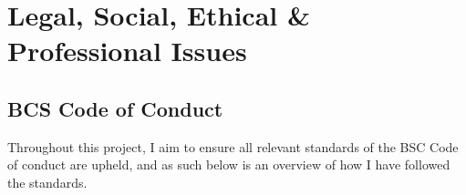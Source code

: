 \chapter{Legal, Social, Ethical \& Professional Issues}


\section{BCS Code of Conduct}

Throughout this project, I aim to ensure all relevant standards of the BSC Code of conduct are upheld, and as such below is an overview of how I have followed the standards.

